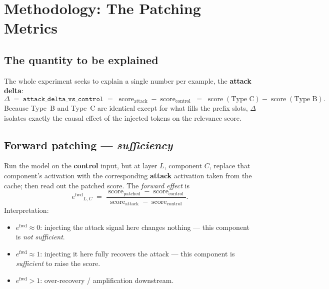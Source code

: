 \documentclass[11pt]{article}
\newcommand{\fwd}{\ensuremath{e^{\mathrm{fwd}}}}
\newcommand{\score}{\operatorname{score}}
\begin{document}
\section{Methodology: The Patching Metrics}

\subsection{The quantity to be explained}

The whole experiment seeks to explain a single number per example, the
\textbf{attack delta}:
\begin{equation}
\Delta \;=\; \texttt{attack\_delta\_vs\_control}
\;=\; \score_{\text{attack}} - \score_{\text{control}}
\;=\; \score(\text{Type C}) - \score(\text{Type B}).
\label{eq:delta}
\end{equation}
Because Type~B and Type~C are identical except for what fills the prefix slots,
$\Delta$ isolates exactly the causal effect of the injected tokens on the
relevance score.

\subsection{Forward patching — \emph{sufficiency}}

Run the model on the \textbf{control} input, but at layer $L$, component $C$,
replace that component's activation with the corresponding \textbf{attack}
activation taken from the cache; then read out the patched score. The
\emph{forward effect} is
\begin{equation}
\fwd_{L,C} \;=\;
\frac{\score_{\text{patched}} - \score_{\text{control}}}
     {\score_{\text{attack}} - \score_{\text{control}}}.
\label{eq:fwd}
\end{equation}
Interpretation:
\begin{itemize}[nosep]
  \item $\fwd \approx 0$: injecting the attack signal here changes nothing — this
        component is \emph{not sufficient}.
  \item $\fwd \approx 1$: injecting it here fully recovers the attack — this
        component is \emph{sufficient} to raise the score.
  \item $\fwd > 1$: over-recovery / amplification downstream.
\end{itemize}
\end{document}
